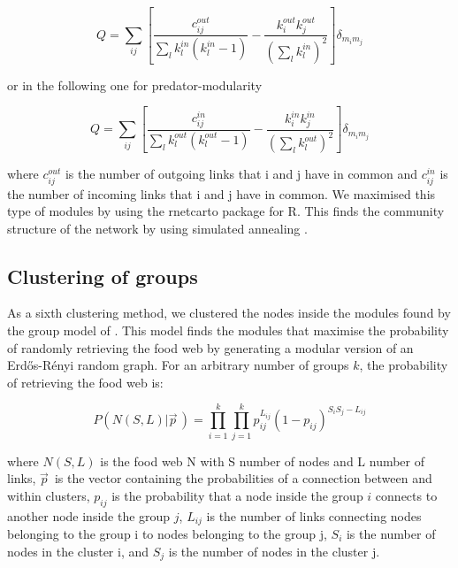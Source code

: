 \documentclass[twocolumn]{article}
\begin{document}
						\begin{equation}
							Q=\sum_{ij}{\left[\frac{c_{ij}^{out}}{\sum_{l}{k_l^{in}\left(k_l^{in}-1\right)}}-\frac{k_i^{out}k_j^{out}}{\left(\sum_{l} k_l^{in}\right)^2}\right]\delta_{m_im_j}}
						\end{equation}

		or in the following one for predator-modularity

						\begin{equation}
							Q=\sum_{ij}{\left[\frac{c_{ij}^{in}}{\sum_{l}{k_l^{out}\left(k_l^{out}-1\right)}}-\frac{k_i^{in}k_j^{in}}{\left(\sum_{l} k_l^{out}\right)^2}\right]\delta_{m_im_j}}
						\end{equation}

		\noindent where $c_{ij}^{out}$ is the number of outgoing links that i and j have in common and $c_{ij}^{in}$ is the number of incoming links that i and j have in common.
		We maximised this type of modules by using the rnetcarto package \citep{Doulcier2015} for R. This finds the community structure of the network by using simulated annealing \citep{Kirkpatrick1983}.  %

	\subsection*{Clustering of groups}

		As a sixth clustering method, we clustered the nodes inside the modules found by the group model of \citep{Allesina2009a}. This model finds the modules that maximise the probability of randomly retrieving the food web by generating a modular version of an Erdős-Rényi random graph. For an arbitrary number of groups $k$, the probability of retrieving the food web is:

				\begin{equation}
					P(N(S,L)|\vec{p}^{\,})=\prod_{i=1}^k\prod_{j=1}^k p_{ij}^{L_{ij}} (1-p_{ij})^{S_i S_j - L_{ij}}
				\end{equation}

		\noindent where $N(S,L)$ is the food web N with S number of nodes and L number of links,  $\vec{p}^{\,}$ is the vector containing the probabilities of a connection between and within clusters, $p_{ij}$ is the probability that a node inside the group $i$ connects to another node inside the group $j$, $L_{ij}$ is the number of links connecting nodes belonging to the group i to nodes belonging to the group j, $S_i$ is the number of nodes in the cluster i,  and $S_j$ is the number of nodes in the cluster j.
\end{document}
